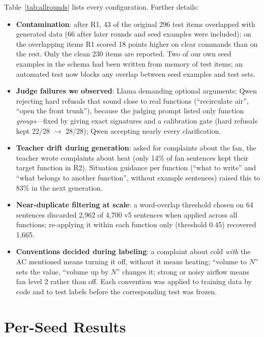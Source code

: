Table~\ref{tab:allrounds} lists every configuration. Further details:
\begin{itemize}
  \item \textbf{Contamination}: after R1, 43 of the original 296 test items overlapped with generated data (66 after later
  rounds and seed examples were included); on the overlapping items R1 scored 18 points higher on clear commands than on the
  rest. Only the clean 230 items are reported. Two of our own seed examples in the schema had been written from memory of test
  items; an automated test now blocks any overlap between seed examples and test sets.
  \item \textbf{Judge failures we observed}: Llama demanding optional arguments; Qwen rejecting hard refusals that sound
  close to real functions (``recirculate air'', ``open the front trunk''), because the judging prompt listed only function
  \emph{groups}---fixed by giving exact signatures and a calibration gate (hard refusals kept 22/28 $\rightarrow$ 28/28);
  Qwen accepting nearly every clarification.
  \item \textbf{Teacher drift during generation}: asked for complaints about the fan, the teacher wrote complaints about heat
  (only 14\% of fan sentences kept their target function in R2). Situation guidance per function (``what to write'' and ``what
  belongs to another function'', without example sentences) raised this to 83\% in the next generation.
  \item \textbf{Near-duplicate filtering at scale}: a word-overlap threshold chosen on 64 sentences discarded 2,962 of 4,700 v5
  sentences when applied across all functions; re-applying it within each function only (threshold 0.45) recovered 1,665.
  \item \textbf{Conventions decided during labeling}: a complaint about cold \emph{with} the AC mentioned means turning it off,
  without it means heating; ``volume to $N$'' sets the value, ``volume up by $N$'' changes it; strong or noisy airflow means fan
  level 2 rather than off. Each convention was applied to training data by code and to test labels before the corresponding
  test was frozen.
\end{itemize}

\section{Per-Seed Results}
\label{app:seeds}

